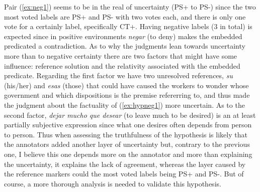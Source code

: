 Pair (\ref{ex:neg1}) seems to be in the real of uncertainty (PS+ to PS-) since the two most voted labels are PS+ and PS- with two votes each, and there is only one vote for a certainly label, specifically CT+. Having negative labels ($3$ in total) is expected since in positive environments \textit{negar} (to deny) makes the embedded predicated a contradiction. As to why the judgments lean towards uncertainty more than to negative certainty there are two factors that might have some influence: reference solution and the relativity associated with the embedded predicate. Regarding the first factor we have two unresolved references, \textit{su} (his/her) and \textit{esas} (those) that could have caused the workers to wonder whose government and which dispositions is the premise refererring to, and thus made the judgment about the factuality of (\ref{ex:hypneg1}) more uncertain. As to the second factor, \textit{dejar mucho que desear} (to leave much to be desired) is an at least partially subjective expression since what one desires often depends from person to person. Thus when assessing the truthfulness of the hypothesis is likely that the annotators added another layer of uncertainty but, contrary to the previous one, I believe this one depends more on the annotator and more than explaining the uncertainty, it explains the lack of agreement, whereas the layer caused by the reference markers could the most voted labels being PS+ and PS-. But of course, a more thorough analysis is needed to validate this hypothesis.\\

